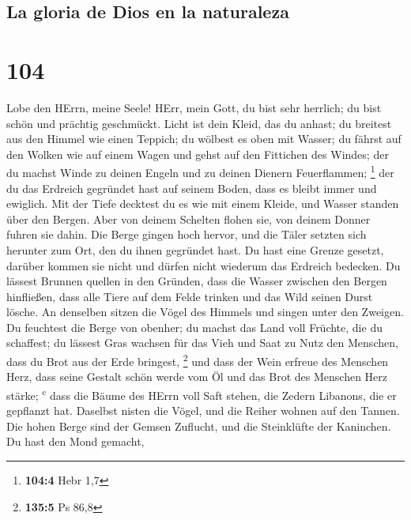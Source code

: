 \hypertarget{la-gloria-de-dios-en-la-naturaleza}{%
\subsection{La gloria de Dios en la
naturaleza}\label{la-gloria-de-dios-en-la-naturaleza}}

\hypertarget{section-103}{%
\section{104}\label{section-103}}

 Lobe den HErrn, meine Seele! HErr, mein Gott, du bist
sehr herrlich; du bist schön und prächtig geschmückt. 
Licht ist dein Kleid, das du anhast; du breitest aus den Himmel wie
einen Teppich;  du wölbest es oben mit Wasser; du fährst
auf den Wolken wie auf einem Wagen und gehst auf den Fittichen des
Windes;  der du machst Winde zu deinen Engeln und zu
deinen Dienern Feuerflammen; \footnote{\textbf{104:4} Hebr 1,7}
 der du das Erdreich gegründet hast auf seinem Boden, dass
es bleibt immer und ewiglich.  Mit der Tiefe decktest du
es wie mit einem Kleide, und Wasser standen über den Bergen.
 Aber von deinem Schelten flohen sie, von deinem Donner
fuhren sie dahin.  Die Berge gingen hoch hervor, und die
Täler setzten sich herunter zum Ort, den du ihnen gegründet hast.
 Du hast eine Grenze gesetzt, darüber kommen sie nicht und
dürfen nicht wiederum das Erdreich bedecken.  Du lässest
Brunnen quellen in den Gründen, dass die Wasser zwischen den Bergen
hinfließen,  dass alle Tiere auf dem Felde trinken und
das Wild seinen Durst lösche.  An denselben sitzen die
Vögel des Himmels und singen unter den Zweigen.  Du
feuchtest die Berge von obenher; du machst das Land voll Früchte, die du
schaffest;  du lässest Gras wachsen für das Vieh und Saat
zu Nutz den Menschen, dass du Brot aus der Erde bringest, \footnote{\textbf{135:5}
  Ps 86,8}  und dass der Wein erfreue des Menschen Herz,
dass seine Gestalt schön werde vom Öl und das Brot des Menschen Herz
stärke; \textsuperscript{c}  dass die Bäume des HErrn
voll Saft stehen, die Zedern Libanons, die er gepflanzt hat.
 Daselbst nisten die Vögel, und die Reiher wohnen auf den
Tannen.  Die hohen Berge sind der Gemsen Zuflucht, und
die Steinklüfte der Kaninchen.  Du hast den Mond gemacht,
